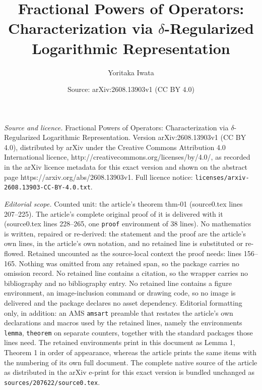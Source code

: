 \documentclass[10pt,a4paper]{amsart}
\title{Fractional Powers of Operators: Characterization via $\delta$-Regularized Logarithmic Representation}
\author{Yoritaka Iwata}
\date{Source: arXiv:2608.13903v1 (CC BY 4.0)}
\begin{document}
\maketitle

\noindent\emph{Source and licence.} Fractional Powers of Operators: Characterization via $\delta$-Regularized Logarithmic Representation. Version arXiv:2608.13903v1 (CC BY 4.0), distributed by arXiv under the Creative Commons Attribution 4.0 International licence, http://creativecommons.org/licenses/by/4.0/, as recorded in the arXiv licence metadata for this exact version and shown on the abstract page https://arxiv.org/abs/2608.13903v1. Full licence notice: \texttt{licenses/arxiv-2608.13903-CC-BY-4.0.txt}.\par\smallskip

\noindent\textit{Editorial scope.} Counted unit: the article's theorem thm-01 (source0.tex lines 207--225). The article's complete original proof of it is delivered with it (source0.tex lines 228--265, one \texttt{proof} environment of 38 lines). No mathematics is written, repaired or re-derived: the statement and the proof are the article's own lines, in the article's own notation, and no retained line is substituted or re-flowed.  Retained uncounted as the source-local context the proof needs: lines 156--165.  Nothing was omitted from any retained span, so the package carries no omission record.  No retained line contains a citation, so the wrapper carries no bibliography and no bibliography entry.  No retained line contains a figure environment, an image-inclusion command or drawing code, so no image is delivered and the package declares no asset dependency.  Editorial formatting only, in addition: an AMS \texttt{amsart} preamble that restates the article's own declarations and macros used by the retained lines, namely the environments \texttt{lemma}, \texttt{theorem} on separate counters, together with the standard packages those lines need.  The retained environments print in this document as Lemma 1, Theorem 1 in order of appearance, whereas the article prints the same items with the numbering of its own full document.  The complete native source of the article as distributed in the arXiv e-print for this exact version is bundled unchanged as \texttt{sources/207622/source0.tex}.
\end{document}
